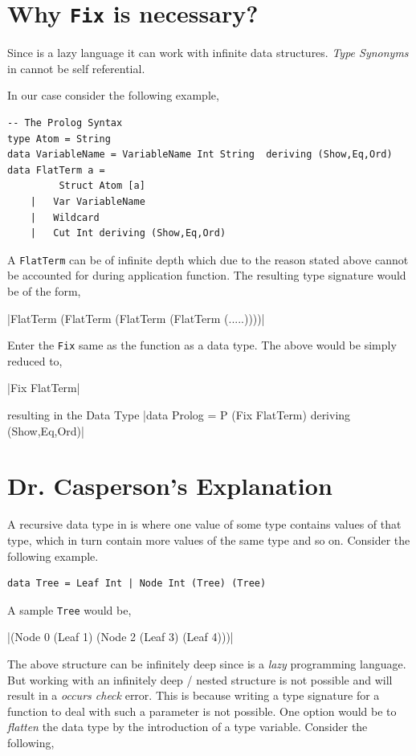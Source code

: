 \documentclass[proposal.tex]{subfiles}
\begin{document}
\section{Why \texttt{Fix} is necessary?}
Since  is a lazy language it can work with infinite data structures. \textit{Type Synonyms} in  cannot be self 
referential.


 

In our case consider the following example,

\begin{verbatim}
-- The Prolog Syntax
type Atom = String
data VariableName = VariableName Int String  deriving (Show,Eq,Ord)
data FlatTerm a = 
		 Struct Atom [a]
	|	Var VariableName
	|	Wildcard
	|	Cut Int deriving (Show,Eq,Ord)
\end{verbatim} 
 
A \texttt{FlatTerm} can be of infinite depth which due to the reason stated above cannot be accounted for during application function. The resulting type signature would be of the form,

|FlatTerm (FlatTerm (FlatTerm (FlatTerm (.....))))|

Enter the \texttt{Fix} same as the function as a data type. The above would be simply reduced to,

|Fix FlatTerm|   

resulting in the  Data Type
|data Prolog = P (Fix FlatTerm) deriving (Show,Eq,Ord)|

\section{Dr. Casperson's Explanation}

A recursive data type in  is where one value of some type contains values of that type, which in turn contain more values of the same type 
and so on. Consider the following example.

\begin{verbatim}
data Tree = Leaf Int | Node Int (Tree) (Tree)
\end{verbatim} 

A sample \texttt{Tree} would be,

|(Node 0 (Leaf 1) (Node 2 (Leaf 3) (Leaf 4)))|

The above structure can be infinitely deep since  is a \textit{lazy} programming language. But working with an infinitely deep / nested 
structure is not possible and will result in a \textit{occurs check} error. This is because writing a type signature for a function to deal with such a
parameter is not possible. One option would be to \textit{flatten} the data type by the introduction of a type variable. Consider the following,
\end{document}
